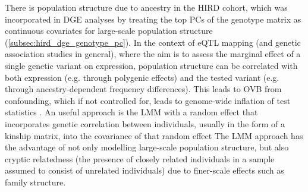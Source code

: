 There is population structure due to ancestry in the \gls{HIRD} cohort,
which was incorporated in \gls{DGE} analyses by treating the top \glspl{PC} of the genotype matrix as continuous covariates for large-scale population structure (\cref{subsec:hird_dge_genotype_pc}).
In the context of \gls{eQTL} mapping (and genetic association studies in general), 
where the aim is to assess the marginal effect of a single genetic variant on expression, 
population structure can be correlated with both expression (e.g. through polygenic effects)
and the tested variant (e.g. through ancestry-dependent frequency differences).
This leads to \gls{OVB} from confounding, which if not controlled for, leads to genome-wide inflation of test statistics \autocite{price2010NewApproachesPopulation}.
%
An useful approach is the \gls{LMM} with a random effect that incorporates genetic correlation between individuals, usually in the form of a kinship matrix, into the covariance of that random effect\autocite{price2010NewApproachesPopulation, eu-ahsunthornwattana2014ComparisonMethodsAccount, golan2018MixedModelsCaseControl}
The \gls{LMM} approach has the advantage of not only modelling large-scale population structure, but also cryptic relatedness (the presence of closely related individuals in a sample assumed to consist of unrelated individuals\autocite{astle2009PopulationStructureCryptic}) due to finer-scale effects such as family structure\autocite{golan2018MixedModelsCaseControl}.
%

